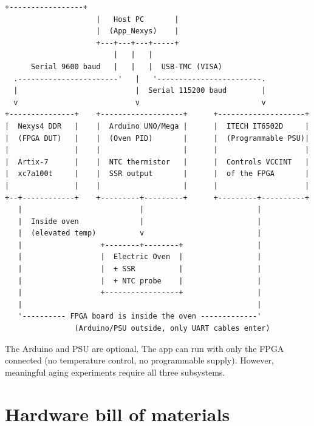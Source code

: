 \documentclass[12pt, a4paper]{report}
\begin{document}
\begin{lstlisting}[style=shell, caption={System block diagram (ASCII)}]
                     +-----------------+
                     |   Host PC       |
                     |  (App_Nexys)    |
                     +---+---+---+-----+
                         |   |   |
      Serial 9600 baud   |   |   |  USB-TMC (VISA)
  .-----------------------'   |   '------------------------.
  |                           |  Serial 115200 baud        |
  v                           v                            v
+---------------+    +-------------------+      +--------------------+
|  Nexys4 DDR   |    |  Arduino UNO/Mega |      |  ITECH IT6502D     |
|  (FPGA DUT)   |    |  (Oven PID)       |      |  (Programmable PSU)|
|               |    |                   |      |                    |
|  Artix-7      |    |  NTC thermistor   |      |  Controls VCCINT   |
|  xc7a100t     |    |  SSR output       |      |  of the FPGA       |
|               |    |                   |      |                    |
+--+------------+    +---------+---------+      +---------+----------+
   |                           |                          |
   |  Inside oven              |                          |
   |  (elevated temp)          v                          |
   |                  +--------+--------+                 |
   |                  |  Electric Oven  |                 |
   |                  |  + SSR          |                 |
   |                  |  + NTC probe    |                 |
   |                  +-----------------+                 |
   |                                                      |
   '---------- FPGA board is inside the oven -------------'
                (Arduino/PSU outside, only UART cables enter)
\end{lstlisting}

\begin{infobox}
The Arduino and PSU are optional. The app can run with only the FPGA connected
(no temperature control, no programmable supply). However, meaningful aging experiments
require all three subsystems.
\end{infobox}

\section{Hardware bill of materials}
\end{document}
